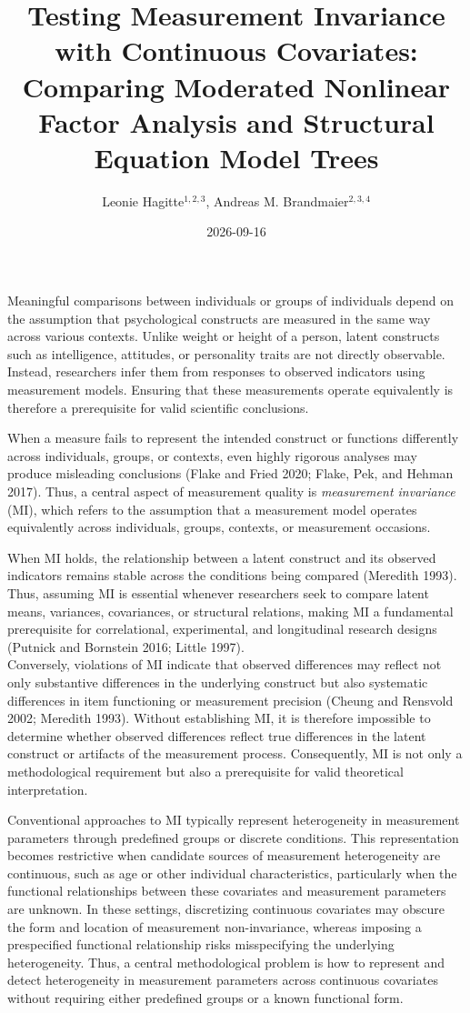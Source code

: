 \documentclass[
  man,
  floatsintext]{apa7}
\affiliation{$^{1}$Goethe University Frankfurt\\ $^{2}$Max Planck Institute for Human Development{,} Berlin{,} Germany\\ $^{3}$MSB Medical School Berlin{,} Berlin{,} Germany\\ $^{4}$Max Planck UCL Centre for Computational Psychiatry and Ageing Research{,} Berlin{,} Germany}
\title{Testing Measurement Invariance with Continuous Covariates:
Comparing Moderated Nonlinear Factor Analysis and Structural Equation
Model Trees}
\author{Leonie Hagitte\(^{1,2,3}\), Andreas M. Brandmaier\(^{2,3,4}\)}
\date{2026-09-16}
\begin{document}
\maketitle

Meaningful comparisons between individuals or groups of individuals
depend on the assumption that psychological constructs are measured in
the same way across various contexts. Unlike weight or height of a
person, latent constructs such as intelligence, attitudes, or
personality traits are not directly observable. Instead, researchers
infer them from responses to observed indicators using measurement
models. Ensuring that these measurements operate equivalently is
therefore a prerequisite for valid scientific conclusions.

When a measure fails to represent the intended construct or functions
differently across individuals, groups, or contexts, even highly
rigorous analyses may produce misleading conclusions (Flake and Fried
2020; Flake, Pek, and Hehman 2017). Thus, a central aspect of
measurement quality is \emph{measurement invariance} (MI), which refers
to the assumption that a measurement model operates equivalently across
individuals, groups, contexts, or measurement occasions.

When MI holds, the relationship between a latent construct and its
observed indicators remains stable across the conditions being compared
(Meredith 1993). Thus, assuming MI is essential whenever researchers
seek to compare latent means, variances, covariances, or structural
relations, making MI a fundamental prerequisite for correlational,
experimental, and longitudinal research designs (Putnick and Bornstein
2016; Little 1997).\\
Conversely, violations of MI indicate that observed differences may
reflect not only substantive differences in the underlying construct but
also systematic differences in item functioning or measurement precision
(Cheung and Rensvold 2002; Meredith 1993). Without establishing MI, it
is therefore impossible to determine whether observed differences
reflect true differences in the latent construct or artifacts of the
measurement process. Consequently, MI is not only a methodological
requirement but also a prerequisite for valid theoretical
interpretation.

Conventional approaches to MI typically represent heterogeneity in
measurement parameters through predefined groups or discrete conditions.
This representation becomes restrictive when candidate sources of
measurement heterogeneity are continuous, such as age or other
individual characteristics, particularly when the functional
relationships between these covariates and measurement parameters are
unknown. In these settings, discretizing continuous covariates may
obscure the form and location of measurement non-invariance, whereas
imposing a prespecified functional relationship risks misspecifying the
underlying heterogeneity. Thus, a central methodological problem is how
to represent and detect heterogeneity in measurement parameters across
continuous covariates without requiring either predefined groups or a
known functional form.
\end{document}
